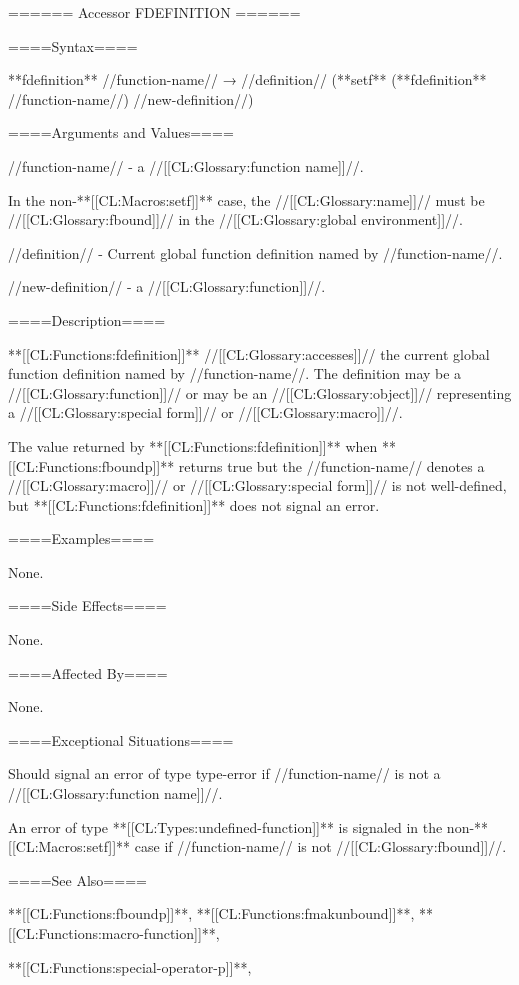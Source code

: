 ====== Accessor FDEFINITION ======

====Syntax====

**fdefinition** //function-name// → //definition// (**setf** (**fdefinition** //function-name//) //new-definition//)

====Arguments and Values====

//function-name// - a //[[CL:Glossary:function name]]//.

In the non-**[[CL:Macros:setf]]** case, the //[[CL:Glossary:name]]// must be //[[CL:Glossary:fbound]]// in the //[[CL:Glossary:global environment]]//.

//definition// - Current global function definition named by //function-name//.

//new-definition// - a //[[CL:Glossary:function]]//.

====Description====

**[[CL:Functions:fdefinition]]** //[[CL:Glossary:accesses]]// the current global function definition named by //function-name//. The definition may be a //[[CL:Glossary:function]]// or may be an //[[CL:Glossary:object]]// representing a //[[CL:Glossary:special form]]// or //[[CL:Glossary:macro]]//.

The value returned by **[[CL:Functions:fdefinition]]** when **[[CL:Functions:fboundp]]** returns true but the //function-name// denotes a //[[CL:Glossary:macro]]// or //[[CL:Glossary:special form]]// is not well-defined, but **[[CL:Functions:fdefinition]]** does not signal an error.

====Examples====

None.

====Side Effects====

None.

====Affected By====

None.

====Exceptional Situations====

Should signal an error of type type-error if //function-name// is not a //[[CL:Glossary:function name]]//.

An error of type **[[CL:Types:undefined-function]]** is signaled in the non-**[[CL:Macros:setf]]** case if //function-name// is not //[[CL:Glossary:fbound]]//.

====See Also====

**[[CL:Functions:fboundp]]**, **[[CL:Functions:fmakunbound]]**, **[[CL:Functions:macro-function]]**,

**[[CL:Functions:special-operator-p]]**,

